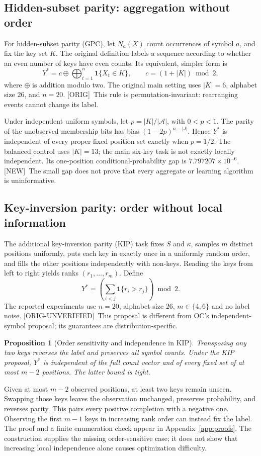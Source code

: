 \documentclass[10pt]{article}
\newcommand{\prov}[1]{{\color{black!65}\scriptsize[#1]}}
\newcommand{\orig}{\prov{ORIG}}
\newcommand{\ou}{\prov{ORIG-UNVERIFIED}}
\newcommand{\newres}{\prov{NEW}}
\newcommand{\ind}{\mathbf{1}}
\newtheorem{proposition}{Proposition}
\begin{document}
\subsection{Hidden-subset parity: aggregation without order}
For hidden-subset parity (GPC), let $N_a(X)$ count occurrences of symbol $a$, and fix the key set $K$. The original definition labels a sequence according to whether an even number of keys have even counts. Its equivalent, simpler form is
\begin{equation}
Y^*=c\oplus\bigoplus_{t=1}^{n}\ind\{X_t\in K\},\qquad c=(1+|K|)\bmod 2,
\label{eq:gpc}
\end{equation}
where $\oplus$ is addition modulo two. The original main setting uses $|K|=6$, alphabet size $26$, and $n=20$. \orig\ This rule is permutation-invariant: rearranging events cannot change its label.

Under independent uniform symbols, let $p=|K|/|\mathcal A|$, with $0<p<1$. The parity of the unobserved membership bits has bias $(1-2p)^{n-|J|}$. Hence $Y^*$ is independent of every proper fixed position set exactly when $p=1/2$. The balanced control uses $|K|=13$; the main six-key task is not exactly locally independent. Its one-position conditional-probability gap is $7.797207\times10^{-6}$. \newres\ The small gap does not prove that every aggregate or learning algorithm is uninformative.

\subsection{Key-inversion parity: order without local information}
The additional key-inversion parity (KIP) task fixes $S$ and $\kappa$, samples $m$ distinct positions uniformly, puts each key in exactly once in a uniformly random order, and fills the other positions independently with non-keys. Reading the keys from left to right yields ranks $(r_1,\ldots,r_m)$. Define
\begin{equation}
Y^*=\left(\sum_{i<j}\ind\{r_i>r_j\}\right)\bmod 2.
\label{eq:kip}
\end{equation}
The reported experiments use $n=20$, alphabet size $26$, $m\in\{4,6\}$ and no label noise. \ou\ This proposal is different from OC's independent-symbol proposal; its guarantees are distribution-specific.

\begin{proposition}[Order sensitivity and independence in KIP]
\label{prop:kip}
Transposing any two keys reverses the label and preserves all symbol counts. Under the KIP proposal, $Y^*$ is independent of the full count vector and of every fixed set of at most $m-2$ positions. The latter bound is tight.
\end{proposition}
Given at most $m-2$ observed positions, at least two keys remain unseen. Swapping those keys leaves the observation unchanged, preserves probability, and reverses parity. This pairs every positive completion with a negative one. Observing the first $m-1$ keys in increasing rank order can instead fix the label. The proof and a finite enumeration check appear in Appendix~\ref{app:proofs}. The construction supplies the missing order-sensitive case; it does not show that increasing local independence alone causes optimization difficulty.
\end{document}
